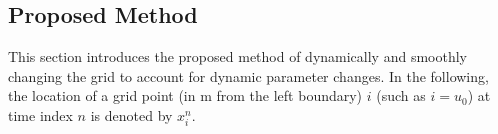 
\subsection{Proposed Method}\label{sec:proposedMethod}
This section introduces the proposed method of dynamically and smoothly changing the grid to account for dynamic parameter changes. %
In the following, the location of a grid point (in m from the left boundary) $i$ (such as $i = u_0$) at time index $n$ is denoted by $x_i^n$. 

